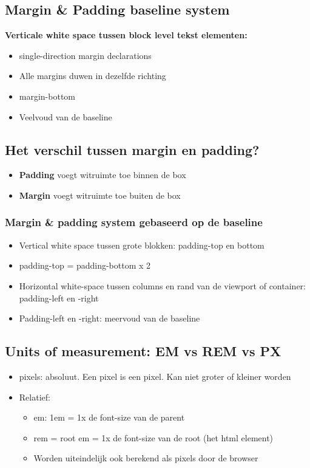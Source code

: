\documentclass{article}
\newcommand{\bold}[1]{\textbf{#1}}
\begin{document}
\subsection{Margin \& Padding baseline system}
\bold{Verticale white space tussen block level tekst elementen:}
\begin{itemize}
    \item single-direction margin declarations
    \item Alle margins duwen in dezelfde richting
    \item margin-bottom
    \item Veelvoud van de baseline
\end{itemize}

\subsection{Het verschil tussen margin en padding?}
\begin{itemize}
    \item \bold{Padding} voegt witruimte toe binnen de box
    \item \bold{Margin} voegt witruimte toe buiten de box
\end{itemize}

\subsubsection{Margin \& padding system gebaseerd op de baseline}
\begin{itemize}
    \item Vertical white space tussen grote blokken: padding-top en bottom
    \item padding-top = padding-bottom x 2
    \item Horizontal white-space tussen columns en rand van de viewport of container: padding-left en -right
    \item Padding-left en -right: meervoud van de baseline
\end{itemize}

\subsection{Units of measurement: EM vs REM vs PX}
\begin{itemize}
    \item pixels: absoluut. Een pixel is een pixel. Kan niet groter of kleiner worden
    \item Relatief:
    \begin{itemize}
        \item em: 1em = 1x de font-size van de parent
        \item rem = root em = 1x de font-size van de root (het html element)
        \item Worden uiteindelijk ook berekend als pixels door de browser
    \end{itemize}
\end{itemize}
\end{document}

